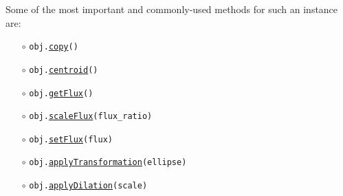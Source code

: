\documentclass[preprint,11pt]{../../devel/modules/aastex}
\begin{document}
Some of the most important and commonly-used methods for such an
instance are:
\begin{itemize}
\item[$\circ$]
  \texttt{obj.}\href{http://galsim-developers.github.com/GalSim/classgalsim_1_1base_1_1_g_s_object.html#aa0b398d4b0fca70211e4a73f81ea7e1a}{\texttt{copy}}\texttt{()}
\item[$\circ$]
  \texttt{obj.}\href{http://galsim-developers.github.com/GalSim/classgalsim_1_1base_1_1_g_s_object.html#a662d8ce421ecd90080bdcaaf6890aed8}{\texttt{centroid}}\texttt{()}
\item[$\circ$]
  \texttt{obj.}\href{http://galsim-developers.github.com/GalSim/classgalsim_1_1base_1_1_g_s_object.html#a662d8ce421ecd90080bdcaaf6890aed8}{\texttt{getFlux}}\texttt{()}
\item[$\circ$]
  \texttt{obj.}\href{http://galsim-developers.github.com/GalSim/classgalsim_1_1base_1_1_g_s_object.html#af4193645a9af52e7d54a044cafec8ab9}{\texttt{scaleFlux}}\texttt{(flux\_ratio)}
\item[$\circ$]
  \texttt{obj.}\href{http://galsim-developers.github.com/GalSim/classgalsim_1_1base_1_1_g_s_object.html#a1993652591ddc802b734186391b28894}{\texttt{setFlux}}\texttt{(flux)}
\item[$\circ$]
  \texttt{obj.}\href{http://galsim-developers.github.com/GalSim/classgalsim_1_1base_1_1_g_s_object.html#ad491a1276fda07b148c6466d5dbd07b1}{\texttt{applyTransformation}}\texttt{(ellipse)}
\item[$\circ$]
  \texttt{obj.}\href{http://galsim-developers.github.com/GalSim/classgalsim_1_1base_1_1_g_s_object.html#a4301c73bbc1491ebb170e64c509cadd5}{\texttt{applyDilation}}\texttt{(scale)}

\end{itemize}
\end{document}
